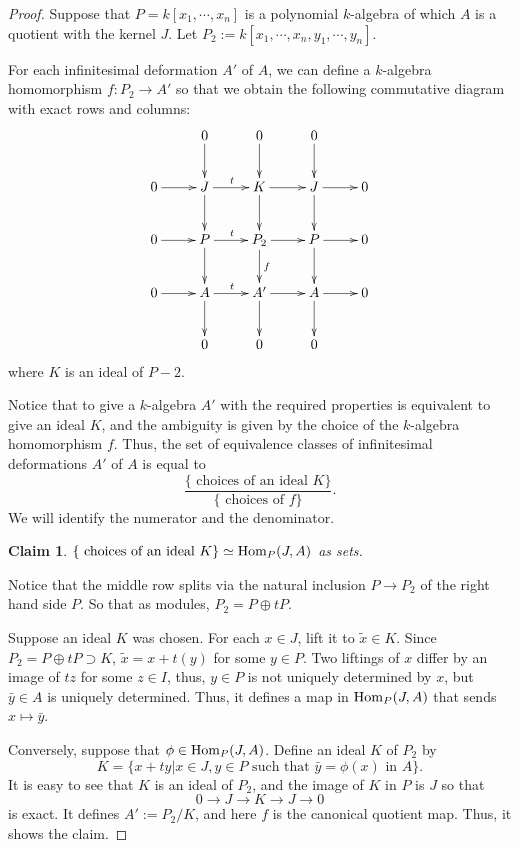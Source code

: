 \documentclass[11pt]{amsart}          %
\newtheorem*{claim}{Claim}
\renewcommand{\hom}{{\rm Hom}}
\begin{document}
\begin{proof} Suppose that $P = k[x_1, \cdots, x_n]$ is a polynomial $k$-algebra of which $A$ is a quotient with the kernel $J$. Let $P_2 := k[x_1, \cdots, x_n, y_1, \cdots, y_n]$. 

For each infinitesimal deformation $A'$ of $A$, we can define a $k$-algebra homomorphism $f: P_2 \to A'$ so that we obtain the following commutative diagram with exact rows and columns:
$$\xymatrix{ & 0 \ar[d] & 0 \ar[d] & 0 \ar[d] & \\
0 \ar[r] & J \ar[r]^t \ar[d] & K \ar[r] \ar[d] & J \ar[r] \ar[d] & 0 \\
0 \ar[r] & P \ar[r] ^t \ar[d] & P_2 \ar[r] \ar[d]^f & P \ar[r] \ar[d] & 0 \\
0 \ar[r] & A \ar[r] ^t \ar[d] & A' \ar[r] \ar[d] & A \ar[r] \ar[d] & 0 \\
& 0 & 0 & 0 &
}$$
where $K$ is an ideal of $P-2$. 

Notice that to give a $k$-algebra $A'$ with the required properties is equivalent to give an ideal $K$, and the ambiguity is given by the choice of the $k$-algebra homomorphism $f$. Thus, the set of equivalence classes of infinitesimal deformations $A'$ of $A$ is equal to
$$\frac{\{\mbox{ choices of an ideal } K \}}{\{{\mbox{ choices of } f}\}}.$$ We will identify the numerator and the denominator.

\begin{claim}
$\{\mbox{ choices of an ideal } K \} \simeq \hom_P (J, A)$ as sets.
\end{claim}
Notice that the middle row splits via the natural inclusion $P \to P_2$ of the right hand side $P$. So that as modules, $P_2 = P \oplus tP$.

Suppose an ideal $K$ was chosen. For each $x \in J$, lift it to $\tilde{x} \in K$. Since $P_2 = P \oplus tP \supset K$, $\tilde{x} = x + t(y)$ for some $y \in P$. Two liftings of $x$ differ by an image of $tz$ for some $z \in I$, thus, $y\in P$ is not uniquely determined by $x$, but $\bar{y} \in A$ is uniquely determined. Thus, it defines a map in $\hom_P (J, A)$ that sends $x \mapsto \bar{y}$.

Conversely, suppose that $\phi \in \hom_P (J, A)$. Define an ideal $K$ of $P_2$ by
$$K = \{ x + t y | x \in J, y \in P \mbox{ such that } \bar{y} = \phi (x) \mbox{ in } A \}.$$ It is easy to see that $K$ is an ideal of $P_2$, and the image of $K$ in $P$ is $J$ so that
$$0 \to J \to K \to J \to 0$$ is exact. It defines $A':= P_2/K$, and here $f$ is the canonical quotient map. Thus, it shows the claim.


\end{proof}
\end{document}
